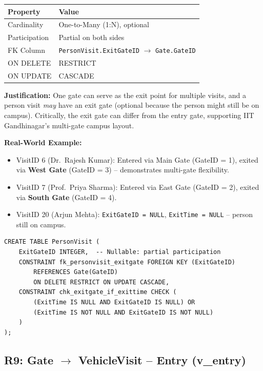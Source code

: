 \documentclass[a4paper, 12pt]{article}
\begin{document}
\begin{table}[H]
\centering
\small
\begin{tabularx}{\textwidth}{l X}
\toprule
\textbf{Property} & \textbf{Value} \\
\midrule
Cardinality & One-to-Many (1:N), optional \\
Participation & Partial on both sides \\
FK Column & \texttt{PersonVisit.ExitGateID} $\rightarrow$ \texttt{Gate.GateID} \\
ON DELETE & RESTRICT \\
ON UPDATE & CASCADE \\
\bottomrule
\end{tabularx}
\end{table}

\textbf{Justification:} One gate can serve as the exit point for multiple visits, and a person visit \textit{may} have an exit gate (optional because the person might still be on campus). Critically, the exit gate can differ from the entry gate, supporting IIT Gandhinagar's multi-gate campus layout.

\textbf{Real-World Example:}
\begin{itemize}[leftmargin=*, nosep]
    \item VisitID 6 (Dr.\ Rajesh Kumar): Entered via Main Gate (GateID = 1), exited via \textbf{West Gate} (GateID = 3) -- demonstrates multi-gate flexibility.
    \item VisitID 7 (Prof.\ Priya Sharma): Entered via East Gate (GateID = 2), exited via \textbf{South Gate} (GateID = 4).
    \item VisitID 20 (Arjun Mehta): \texttt{ExitGateID = NULL}, \texttt{ExitTime = NULL} -- person still on campus.
\end{itemize}

\begin{lstlisting}[style=sqlstyle, caption={R8 Implementation}, label={lst:r8}]
CREATE TABLE PersonVisit (
    ExitGateID INTEGER,  -- Nullable: partial participation
    CONSTRAINT fk_personvisit_exitgate FOREIGN KEY (ExitGateID)
        REFERENCES Gate(GateID)
        ON DELETE RESTRICT ON UPDATE CASCADE,
    CONSTRAINT chk_exitgate_if_exittime CHECK (
        (ExitTime IS NULL AND ExitGateID IS NULL) OR
        (ExitTime IS NOT NULL AND ExitGateID IS NOT NULL)
    )
);
\end{lstlisting}

\subsection{R9: Gate \texorpdfstring{$\rightarrow$}{->} VehicleVisit -- Entry (v\_entry)}
\end{document}
